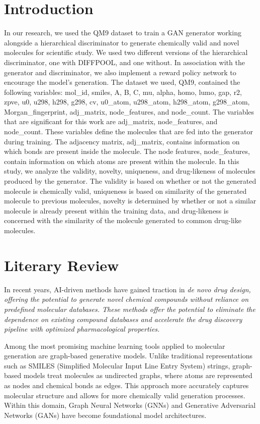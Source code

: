 \documentclass[conference]{IEEEtran}
\begin{document}
\section{Introduction}
In our research, we used the QM9 dataset to train a GAN generator working alongside a 
hierarchical discriminator to generate chemically valid and novel molecules for scientific 
study. We used two different versions of the hierarchical discriminator, one with DIFFPOOL, 
and one without. In association with the generator and discriminator, we also implement a 
reward policy network to encourage the model's generation. The dataset we used, QM9, contained 
the following variables: mol\_id, smiles, A, B, C, mu, alpha, homo, lumo, gap, r2, zpve, u0, u298, 
h298, g298, cv, u0\_atom, u298\_atom, h298\_atom, g298\_atom, Morgan\_fingerprint, adj\_matrix, 
node\_features, and node\_count. The variables that are significant for this work are adj\_matrix, 
node\_features, and node\_count. These variables define the molecules that are fed into the generator 
during training. The adjacency matrix, adj\_matrix, contains information on which bonds are present 
inside the molecule. The node features, node\_features, contain information on which atoms are 
present within the molecule. In this study, we analyze the validity, novelty, uniqueness, and 
drug-likeness of molecules produced by the generator. The validity is based on whether or not 
the generated molecule is chemically valid, uniqueness is based on similarity of the generated 
molecule to previous molecules, novelty is determined by whether or not a similar molecule is 
already present within the training data, and drug-likeness is concerned with the similarity of 
the molecule generated to common drug-like molecules. 

\section{Literary Review}
In recent years, AI-driven methods have gained traction in \it{de novo} drug design, offering the potential 
to generate novel chemical compounds without reliance on predefined molecular databases. These methods offer the 
potential to eliminate the dependence on existing compound databases and accelerate the drug discovery pipeline with 
optimized pharmacological properties. 

Among the most promising machine learning tools applied to molecular generation are graph-based generative models. 
Unlike traditional representations such as SMILES (Simplified Molecular Input Line Entry System) strings, graph-based 
models treat molecules as undirected graphs, where atoms are represented as nodes and chemical bonds as edges. This 
approach more accurately captures molecular structure and allows for more chemically valid generation processes. Within 
this domain, Graph Neural Networks (GNNs) and Generative Adversarial Networks (GANs) have become foundational model architectures. 
\end{document}
